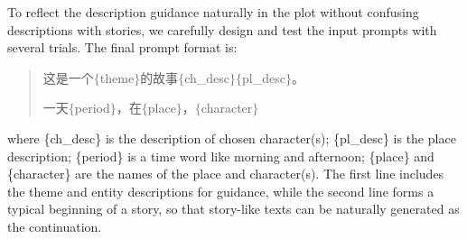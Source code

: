 \documentclass{article}
\begin{document}
To reflect the description guidance naturally in the plot without confusing 
descriptions with stories, we carefully design and test the input prompts 
with several trials. The final prompt format is: 
\begin{quote}
\begin{CJK}{UTF8}{gbsn}
这是一个$\{$theme$\}$的故事$\{$ch\_desc$\}$$\{$pl\_desc$\}$。

一天$\{$period$\}$，在$\{$place$\}$，$\{$character$\}$
\end{CJK}


\end{quote}
where \{ch\_desc\} is the description of chosen character(s); \{pl\_desc\} is the place description; \{period\} is a time word like morning and afternoon; \{place\} and \{character\} are the names of the place and character(s). The first line includes 
the theme and entity descriptions for guidance, while the second line forms 
a typical beginning of a story, so that story-like texts can be naturally 
generated as the continuation. 


    



\end{document}

